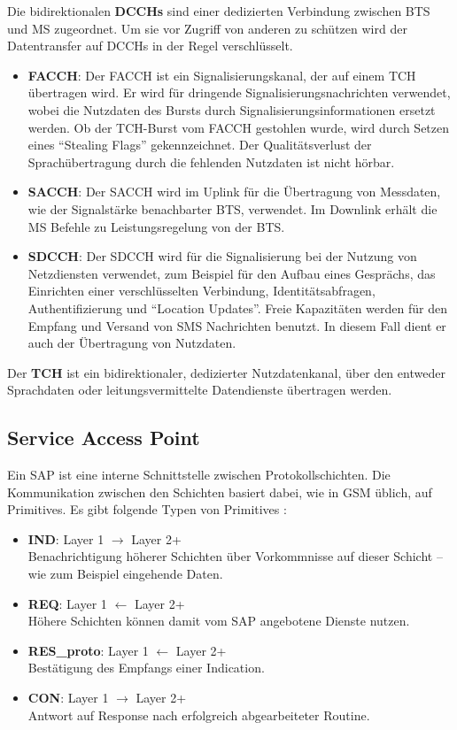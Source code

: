 Die bidirektionalen \textbf{\acfp{DCCH}} sind einer dedizierten Verbindung zwischen \ac{BTS} und \ac{MS} zugeordnet. Um sie vor Zugriff von anderen zu schützen wird der Datentransfer auf \acp{DCCH} in der Regel verschlüsselt. 
\begin{itemize}
\item \textbf{\ac{FACCH}}: Der \ac{FACCH} ist ein Signalisierungskanal, der auf einem \ac{TCH} übertragen wird. Er wird für dringende Signalisierungsnachrichten verwendet, wobei die Nutzdaten des Bursts durch Signalisierungsinformationen ersetzt werden. Ob der \ac{TCH}-Burst vom \ac{FACCH} gestohlen wurde, wird durch Setzen eines "`Stealing Flags"' gekennzeichnet. Der Qualitätsverlust der Sprachübertragung durch die fehlenden Nutzdaten ist nicht hörbar.
\item \textbf{\ac{SACCH}}: Der \ac{SACCH} wird im Uplink für die Übertragung von Messdaten, wie der Signalstärke benachbarter \ac{BTS}, verwendet. Im Downlink erhält die \ac{MS} Befehle zu Leistungsregelung von der \ac{BTS}. 
\item \textbf{\ac{SDCCH}}: Der \ac{SDCCH} wird für die Signalisierung bei der Nutzung von Netzdiensten verwendet, zum Beispiel für den Aufbau eines Gesprächs, das Einrichten einer verschlüsselten Verbindung, Identitätsabfragen, Authentifizierung und "`Location Updates"'. Freie Kapazitäten werden für den Empfang und Versand von \ac{SMS} Nachrichten benutzt. In diesem Fall dient er auch der Übertragung von Nutzdaten.
\end{itemize}

Der \textbf{\ac{TCH}} ist ein bidirektionaler, dedizierter Nutzdatenkanal, über den entweder Sprachdaten oder leitungsvermittelte Datendienste übertragen werden.

\subsection{Service Access Point}\label{hdl:sap}

Ein \ac{SAP} ist eine interne Schnittstelle zwischen Protokollschichten. Die Kommunikation zwischen den Schichten basiert dabei, wie in \ac{GSM} üblich, auf Primitives. Es gibt folgende Typen von Primitives :

\begin{itemize}
\item \textbf{\ac{IND}}: Layer 1 $\rightarrow$ Layer 2+\\
Benachrichtigung höherer Schichten über Vorkommnisse auf dieser Schicht -- wie zum Beispiel eingehende Daten.
\item \textbf{\ac{REQ}}: Layer 1 $\leftarrow$ Layer 2+\\
Höhere Schichten können damit vom \ac{SAP} angebotene Dienste nutzen.
\item \textbf{\ac{RES_proto}}: Layer 1 $\leftarrow$ Layer 2+\\
Bestätigung des Empfangs einer Indication.
\item \textbf{\ac{CON}}: Layer 1 $\rightarrow$ Layer 2+\\
Antwort auf Response nach erfolgreich abgearbeiteter Routine.
\end{itemize}

